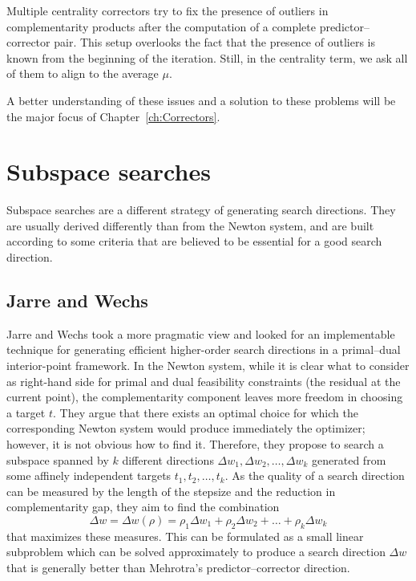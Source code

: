 Multiple centrality correctors try to fix the presence of outliers in 
complementarity products after the computation of a complete 
predictor--corrector pair. This setup overlooks the fact that the 
presence of outliers is known from the beginning of the iteration. 
Still, in the centrality term,  we ask all of them to align to the 
average $\mu$.

A better understanding of these issues and a solution to these
problems will be the major focus of Chapter~\ref{ch:Correctors}.


%
%
\section{Subspace searches}

Subspace searches are a different strategy of generating search 
directions. 
They are usually derived differently than from the Newton system, and 
are built according to some criteria that are believed to be essential 
for a good search direction.

%
%
\subsection{Jarre and Wechs}

Jarre and Wechs \cite{JarreWechs} took a more pragmatic view and
looked for an implementable technique for generating efficient 
higher-order search directions in a primal--dual interior-point framework.
In the Newton system, while it is clear what to consider as right-hand 
side for primal and dual feasibility constraints (the residual 
at the current point), the complementarity component leaves more 
freedom in choosing a target $t$. They argue that there exists 
an optimal choice for which the corresponding Newton system would 
produce immediately the optimizer; however, it is not obvious how 
to find it.
Therefore, they propose to search a subspace spanned by $k$ different 
directions $\Delta w_1, \Delta w_2, \ldots, \Delta w_k$ generated 
from some affinely independent targets $t_1,t_2,\ldots,t_k$.
As the quality of a search direction can be measured by the length 
of the stepsize and the reduction in complementarity gap, they aim 
to find the combination 
\[
\Delta w = \Delta w(\rho) 
         = \rho_1\Delta w_1 + \rho_2\Delta w_2 + \ldots + \rho_k\Delta w_k
\]
that maximizes these measures.
This can be formulated as a small linear subproblem which can 
be solved approximately to produce a search direction $\Delta w$ 
that is generally better than Mehrotra's predictor--corrector direction.

